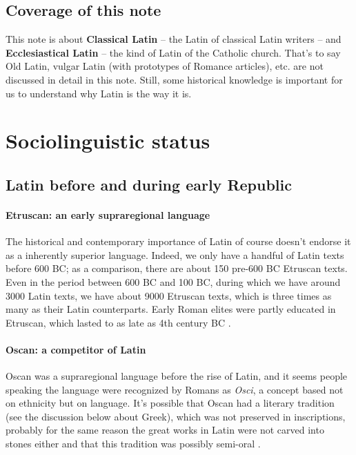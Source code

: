 \documentclass[a4paper, oneside, 12pt]{report}
\newcommand*{\citepage}[1]{p.~{#1}}
\newcommand*{\concept}[1]{\textbf{#1}}
\newcommand{\form}[1]{\emph{#1}}
\begin{document}
\subsection{Coverage of this note}

This note is about \concept{Classical Latin} -- the Latin of classical Latin writers -- 
and \concept{Ecclesiastical Latin} -- the kind of Latin of the Catholic church.
That's to say Old Latin, vulgar Latin (with prototypes of Romance articles), etc.
are not discussed in detail in this note.
Still, some historical knowledge is important for us to understand 
why Latin is the way it is. 

\section{Sociolinguistic status}

\subsection{Latin before and during early Republic}

\paragraph*{Etruscan: an early supraregional language}
The historical and contemporary importance of Latin 
of course doesn't endorse it as a inherently superior language. 
Indeed, we only have a handful of Latin texts before 600 BC; 
as a comparison, there are about 150 pre-600 BC Etruscan texts.
Even in the period between 600 BC and 100 BC, 
during which we have around 3000 Latin texts,
we have about 9000 Etruscan texts, 
which is three times as many as their Latin counterparts. 
Early Roman elites were partly educated in Etruscan,
which lasted to as late as 4th century BC \citep[\citepage{43}]{leonhardt2013latin}.

\paragraph*{Oscan: a competitor of Latin}
Oscan was a supraregional language before the rise of Latin,
and it seems people speaking the language were recognized by Romans as \form{Osci},
a concept based not on ethnicity but on language.
It's possible that Oscan had a literary tradition (see the discussion below about Greek),
which was not preserved in inscriptions,
probably for the same reason the great works in Latin were not carved into stones either
and that this tradition was possibly semi-oral \citep[\citepage{51}]{leonhardt2013latin}.
\end{document}
